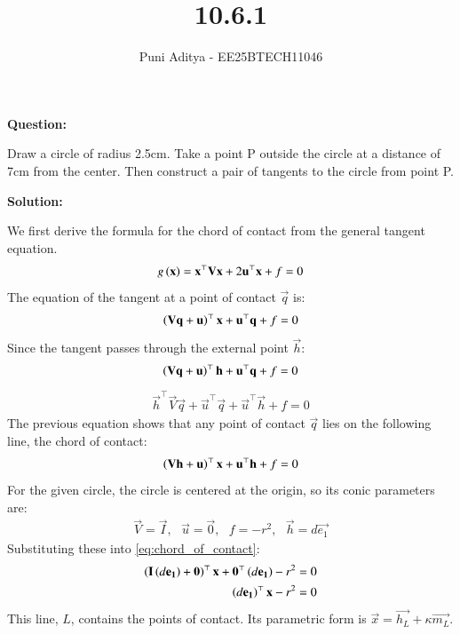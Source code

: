 \documentclass[journal]{IEEEtran}
\begin{document}
\title{10.6.1}
\author{Puni Aditya - EE25BTECH11046}
\maketitle

\textbf{Question:}

Draw a circle of radius 2.5cm. Take a point P outside the circle at a distance of 7cm from the center. Then construct a pair of tangents to the circle from point P.

\textbf{Solution:}

We first derive the formula for the chord of contact from the general tangent equation.
\begin{align*}
    g\left(\mathbf{x}\right) = \mathbf{x}^\top\mathbf{V}\mathbf{x} + 2\mathbf{u}^\top\mathbf{x} + f = 0
\end{align*}
The equation of the tangent at a point of contact $\vec{q}$ is:
\begin{align}
    \left(\mathbf{V}\mathbf{q} + \mathbf{u}\right)^\top\mathbf{x} + \mathbf{u}^\top\mathbf{q} + f = 0 \label{eq:tangent}
\end{align}
Since the tangent passes through the external point $\vec{h}$:
\begin{align}
    \left(\mathbf{V}\mathbf{q} + \mathbf{u}\right)^\top\mathbf{h} + \mathbf{u}^\top\mathbf{q} + f = 0 \label{eq:point_on_tangent}
\end{align}
\begin{align}
    \vec{h}^\top\vec{V}\vec{q} + \vec{u}^\top\vec{q} + \vec{u}^\top\vec{h} + f = 0 \label{eq:rearranged}
\end{align}
The previous equation shows that any point of contact $\vec{q}$ lies on the following line, the chord of contact:
\begin{align}
    \left(\mathbf{V}\mathbf{h} + \mathbf{u}\right)^\top\mathbf{x} + \mathbf{u}^\top\mathbf{h} + f = 0 \label{eq:chord_of_contact}
\end{align}
For the given circle, the circle is centered at the origin, so its conic parameters are:
\begin{align}
    \vec{V} = \vec{I}, \text{ } \vec{u} = \vec{0}, \text{ } f = -r^2, \text{ } \vec{h} = d\vec{e_1}
\end{align}
Substituting these into \eqref{eq:chord_of_contact}:
\begin{align}
    \left(\mathbf{I}\left(d\mathbf{e_1}\right) + \mathbf{0}\right)^\top\mathbf{x} + \mathbf{0}^\top\left(d\mathbf{e_1}\right) - r^2 &= 0 \\
    \left(d\mathbf{e_1}\right)^\top\mathbf{x} - r^2 &= 0
\end{align}
This line, $L$, contains the points of contact. Its parametric form is $\vec{x} = \vec{h_L} + \kappa\vec{m_L}$.
\end{document}
